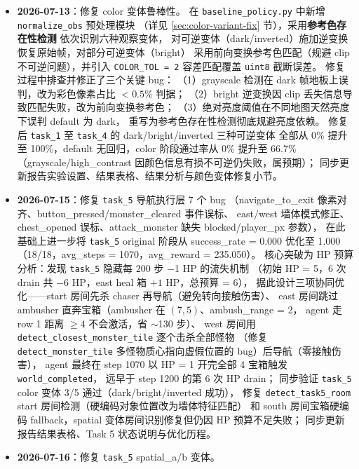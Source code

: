 \documentclass[12pt,a4paper]{ctexart}
\begin{document}
\begin{itemize}[leftmargin=2em]
  color 变体预期失败（策略基于精确 RGB 匹配）；
  更新 \texttt{eval\_results.json} 与报告实验章节。
  \item \textbf{2026-07-13}：修复 color 变体鲁棒性。
  在 \texttt{baseline\_policy.py} 中新增 \texttt{normalize\_obs} 预处理模块
  （详见 \ref{sec:color-variant-fix} 节），采用\textbf{参考色存在性检测}
  依次识别六种观察变体，
  对可逆变体（dark/inverted）施加逆变换恢复原始帧，对部分可逆变体（bright）
  采用前向变换参考色匹配（规避 clip 不可逆问题），并引入 \texttt{COLOR\_TOL = 2}
  容差匹配覆盖 \texttt{uint8} 截断误差。
  修复过程中排查并修正了三个关键 bug：
  （1）grayscale 检测在 dark 帧地板上误判，改为彩色像素占比 $< 0.5\%$ 判据；
  （2）bright 逆变换因 clip 丢失信息导致匹配失败，改为前向变换参考色；
  （3）绝对亮度阈值在不同地图天然亮度下误判 default 为 dark，
  重写为参考色存在性检测彻底规避亮度依赖。
  修复后 \texttt{task\_1} 至 \texttt{task\_4} 的 dark/bright/inverted 三种可逆变体
  全部从 0\% 提升至 100\%，default 无回归，color 阶段通过率从 0\% 提升至 66.7\%
  （grayscale/high\_contrast 因颜色信息有损不可逆仍失败，属预期）；
  同步更新报告实验设置、结果表格、结果分析与颜色变体修复小节。
  \item \textbf{2026-07-15}：修复 \texttt{task\_5} 导航执行层 7 个 bug
  （navigate\_to\_exit 像素对齐、button\_pressed/monster\_cleared 事件误标、
  east/west 墙体模式修正、chest\_opened 误标、attack\_monster 缺失 blocked/player\_px 参数），
  在此基础上进一步将 \texttt{task\_5} original 阶段从
  success\_rate = 0.000 优化至 1.000（18/18，avg\_steps = 1070，avg\_reward = 235.050）。
  核心突破为 HP 预算分析：发现 \texttt{task\_5} 隐藏每 200 步 $-$1 HP 的流失机制
  （初始 HP = 5，6 次 drain 共 $-$6 HP，east heal 箱 $+1$ HP，总预算 = 6），
  据此设计三项协同优化——start 房间先杀 chaser 再导航（避免转向接触伤害）、
  east 房间跳过 ambusher 直奔宝箱（ambusher 在 $(7,5)$、ambush\_range = 2，
  agent 走 row 1 距离 $\geq 4$ 不会激活，省 $\sim$130 步）、
  west 房间用 \texttt{detect\_closest\_monster\_tile} 逐个击杀全部怪物
  （修复 \texttt{detect\_monster\_tile} 多怪物质心指向虚假位置的 bug）后导航（零接触伤害），
  agent 最终在 step 1070 以 HP = 1 开完全部 4 宝箱触发 \texttt{world\_completed}，
  远早于 step 1200 的第 6 次 HP drain；
  同步验证 \texttt{task\_5} color 变体 3/5 通过（dark/bright/inverted 成功），
  修复 \texttt{detect\_task5\_room} start 房间检测（硬编码对象位置改为墙体特征匹配）
  和 south 房间宝箱硬编码 fallback，spatial 变体房间识别修复但仍因 HP 预算不足失败；
  同步更新报告结果表格、Task 5 状态说明与优化历程。
  \item \textbf{2026-07-16}：修复 \texttt{task\_5} spatial\_a/b 变体。

\end{itemize}
\end{document}
